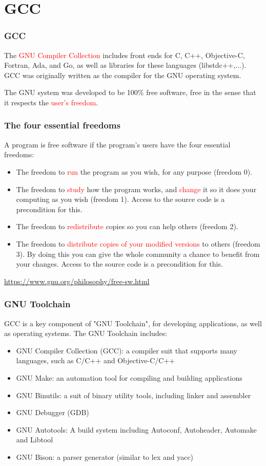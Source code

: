 \documentclass{beamer}
\begin{document}
\section{GCC}
\begin{frame}
\frametitle{GCC}
The \textcolor{red}{GNU Compiler Collection} includes front ends for C, C++, Objective-C, Fortran, Ada, and Go, as well as libraries for these languages (libstdc++,...). GCC was originally written as the compiler for the GNU operating system. 

The GNU system was developed to be 100\% free software, free in the sense that it respects the \textcolor{red}{user's freedom}.

\end{frame}
\begin{frame}
\frametitle{The four essential freedoms}
A program is free software if the program's users have the four essential freedoms:
\begin{itemize}
\item
The freedom to \textcolor{red}{run} the program as you wish, for any purpose (freedom 0).
\item
The freedom to \textcolor{red}{study} how the program works, and \textcolor{red}{change} it so it does your computing as you wish (freedom 1). Access to the source code is a precondition for this.
\item
The freedom to \textcolor{red}{redistribute} copies so you can help others (freedom 2).
\item
The freedom to \textcolor{red}{distribute copies of your modified versions} to others (freedom 3). By doing this you can give the whole community a chance to benefit from your changes. Access to the source code is a precondition for this.
\end{itemize}
\url{https://www.gnu.org/philosophy/free-sw.html}

\end{frame}
\begin{frame}
\frametitle{GNU Toolchain}
GCC is a key component of "GNU Toolchain", for developing applications, as well as operating systems. The GNU Toolchain includes:
\begin{itemize}
\item GNU Compiler Collection (GCC): a compiler suit that supports many languages, such as C/C++ and Objective-C/C++
\item GNU Make: an automation tool for compiling and building applications
\item GNU Binutils: a suit of binary utility tools, including linker and assembler
\item GNU Debugger (GDB)
\item GNU Autotools: A build system including Autoconf, Autoheader, Automake and Libtool
\item GNU Bison: a parser generator (similar to lex and yacc)
\end{itemize}
\end{frame}
\end{document}
